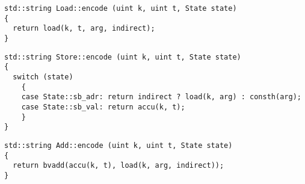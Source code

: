 


\begin{lstlisting}[style=c++, style=encode]
std::string Load::encode (uint k, uint t, State state)
{
  return load(k, t, arg, indirect);
}
\end{lstlisting}


\begin{lstlisting}[style=c++, style=encode]
std::string Store::encode (uint k, uint t, State state)
{
  switch (state)
    {
    case State::sb_adr: return indirect ? load(k, arg) : consth(arg);
    case State::sb_val: return accu(k, t);
    }
}
\end{lstlisting}


\begin{lstlisting}[style=c++, style=encode]
std::string Add::encode (uint k, uint t, State state)
{
  return bvadd(accu(k, t), load(k, arg, indirect));
}
\end{lstlisting}

